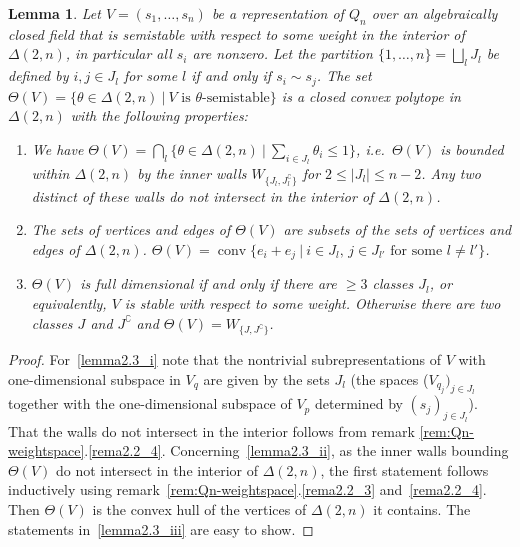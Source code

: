 \documentclass[10pt,a4paper]{amsart}
\newcommand{\ie}{i.e.\ }
\newtheorem{lemma}[theo]{Lemma}
\theoremstyle{definition}
\DeclareMathOperator{\conv}{conv}
\begin{document}
\begin{lemma}\label{lemma:repr-pol-Qn}
Let $V=(s_1,\ldots,s_n)$ be a representation of $Q_n$ over an algebraically closed 
field that is semistable with respect to some weight in the interior of $\Delta(2,n)$,
in particular all $s_i$ are nonzero. Let the partition $\{1,\ldots,n\}=\bigsqcup_lJ_l$ 
be defined by $i,j\in J_l$ for some $l$ if and only if $s_i\sim s_j$.
The set $\Theta(V)=\{\theta\in\Delta(2,n)\:|\:\text{$V$ is $\theta$-semistable}\}$ 
is a closed convex polytope in $\Delta(2,n)$ with the following properties:

\begin{enumerate}[label=(\alph*)]
\item\label{lemma2.3_i} We have 
$\Theta(V)=\bigcap_l\{\theta\in\Delta(2,n)\:|\:\sum_{i\in J_l}\theta_i\leq 1\}$,
\ie $\Theta(V)$ is bounded within $\Delta(2,n)$ by the inner walls 
$W_{\{J_l,J_l^\complement\}}$ for $2\leq|J_l|\leq n-2$. Any two distinct of 
these walls do not intersect in the interior of $\Delta(2,n)$.

\item\label{lemma2.3_ii} The sets of vertices and edges of $\Theta(V)$ are subsets of the sets 
of vertices and edges of $\Delta(2,n)$.
$\Theta(V)=\conv\{e_i+e_j\:|\:\text{$i\in J_l$, $j\in J_{l'}$ for some $l\neq l'$}\}$.

\item\label{lemma2.3_iii} $\Theta(V)$ is full dimensional if and only if there are $\geq3$
classes $J_l$, or equivalently, $V$ is stable with respect to some
weight. Otherwise there are two classes $J$ and $J^\complement$ and 
$\Theta(V)=W_{\{J,J^\complement\}}$.
\end{enumerate}
\end{lemma}
\begin{proof} 
For~\ref{lemma2.3_i} note that the nontrivial subrepresentations of $V$ with one-dimensional 
subspace in $V_q$ are given by the sets $J_l$ (the spaces ($V_{q_j})_{j\in J_l}$ 
together with the one-dimensional subspace of $V_p$ determined by $(s_j)_{j\in J_l}$). 
That the walls do not intersect in the interior follows from remark 
\ref{rem:Qn-weightspace}.\ref{rema2.2_4}.
Concerning~\ref{lemma2.3_ii}, as the inner walls bounding $\Theta(V)$ do not intersect in the
interior of $\Delta(2,n)$, the first statement follows inductively using
remark~\ref{rem:Qn-weightspace}.\ref{rema2.2_3} and~\ref{rema2.2_4}. Then $\Theta(V)$ is the convex hull
of the vertices of $\Delta(2,n)$ it contains.
The statements in~\ref{lemma2.3_iii} are easy to show.
\end{proof}
\end{document}
